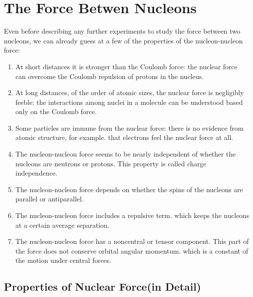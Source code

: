 \chapter{The Force Betwen Nucleons}
Even before describing any further experiments to study the force between two nucleons, we can already guess at a few of the properties of the nucleon-nucleon force:\\
\begin{enumerate}
	\item At short distances it is stronger than the Coulomb force: the nuclear force can overcome the Coulomb repulsion of protons in the nucleus.
	\item At long distances, of the order of atomic sizes, the nuclear force is negligibly feeble: the interactions among nuclei in a molecule can be understood based only on the Coulomb force.
	\item Some particles are immune from the nuclear force: there is no evidence from atomic structure, for example. that electrons feel the nuclear force at all.
	\item The nucleon-nucleon force seems to be nearly independent of whether the nucleons are neutrons or protons. This property is called charge independence.
	\item The nucleon-nucleon force depends on whether the spins of the nucleons are parallel or antiparallel.
	\item The nucleon-nucleon force includes a repulsive term. which keeps the nucleons at a certain average separation.
	\item The nucleon-nucleon force has a noncentral or tensor component. This part of the force does not conserve orbital angular momentum. which is a constant of the motion under central forces.
\end{enumerate}
\section{Properties of Nuclear Force(in Detail)}
